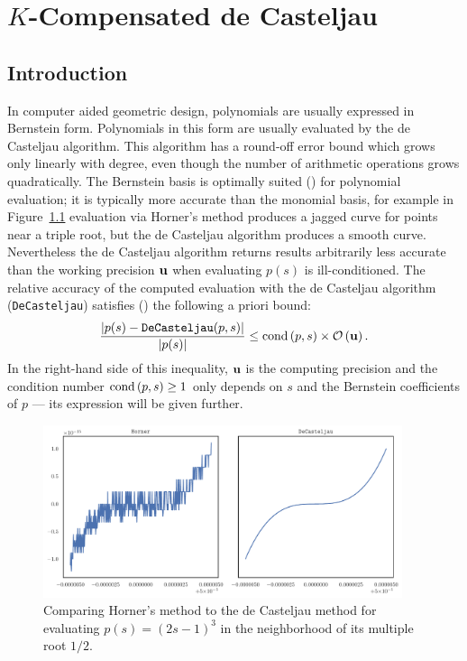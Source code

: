 \chapter{\(K\)-Compensated de Casteljau}\label{chap:k-compensated}

\section{Introduction}

In computer aided geometric design, polynomials are usually expressed in
Bernstein form. Polynomials in this form are usually evaluated by the
de Casteljau algorithm. This algorithm has a round-off error bound
which grows only linearly with degree, even though the number of
arithmetic operations grows quadratically. The Bernstein basis is
optimally suited (\cite{Farouki1987, Delgado2015, Mainar2005})
for polynomial evaluation; it is
typically more accurate than the monomial basis, for example in
Figure~\ref{fig:horner-inferior} evaluation via Horner's method produces
a jagged curve for points near a triple root, but the de Casteljau algorithm
produces a smooth curve. Nevertheless the de Casteljau
algorithm returns results arbitrarily less accurate than the working
precision \(\mathbf{u}\) when evaluating \(p(s)\) is ill-conditioned.
The relative accuracy of the computed
evaluation with the de Casteljau algorithm (\texttt{DeCasteljau}) satisfies
(\cite{Mainar1999}) the following a priori bound:
\begin{equation}\label{eq:de-casteljau-error}
  \frac{\left|p(s) - \mathtt{DeCasteljau}(p, s)\right|}{\left|p(s)\right|} \leq
  \operatorname{cond}\left(p, s\right) \times \mathcal{O}\left(\mathbf{u}\right).
\end{equation}
In the right-hand side of this inequality, \(\mathbf{u}\) is the computing
precision and the condition number \(\operatorname{cond}\left(p, s\right) \geq 1\) only depends
on \(s\) and the Bernstein coefficients of \(p\) --- its expression will
be given further.

\begin{figure}
  \includegraphics[width=0.9375\textwidth]{../images/k-compensated/horner_inferior.pdf}
  \centering
  \captionsetup{width=.75\linewidth}
  \caption{Comparing Horner's method to the de Casteljau method for
    evaluating \(p(s) = (2s - 1)^3\) in the neighborhood of its
    multiple root \(1/2\).}
  \label{fig:horner-inferior}
\end{figure}

